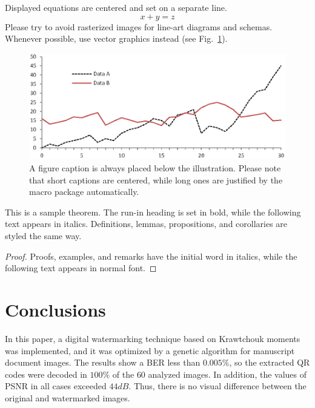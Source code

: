 \documentclass[runningheads]{llncs}
\begin{document}
\noindent Displayed equations are centered and set on a separate
line.
\begin{equation}
x + y = z
\end{equation}
Please try to avoid rasterized images for line-art diagrams and
schemas. Whenever possible, use vector graphics instead (see
Fig.~\ref{fig1}).

\begin{figure}
\includegraphics[width=\textwidth]{fig1.eps}
\caption{A figure caption is always placed below the illustration.
Please note that short captions are centered, while long ones are
justified by the macro package automatically.} \label{fig1}
\end{figure}

\begin{theorem}
This is a sample theorem. The run-in heading is set in bold, while
the following text appears in italics. Definitions, lemmas,
propositions, and corollaries are styled the same way.
\end{theorem}
%
%
\begin{proof}
Proofs, examples, and remarks have the initial word in italics,
while the following text appears in normal font.
\end{proof}
\section{Conclusions}
In this paper, a digital watermarking technique based on Krawtchouk moments was implemented, and it was optimized by a genetic algorithm for manuscript document images. The results show a BER less than $0.005 \%$, so the extracted QR codes were decoded in $100\%$ of the $60$ analyzed images. In addition, the values of PSNR in all cases exceeded $44dB$. Thus, there is no visual difference between the original and watermarked images.
%
%
%


%
\end{document}
